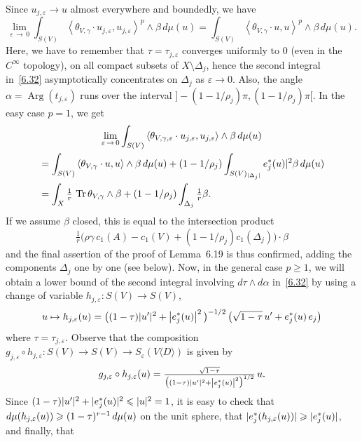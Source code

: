 \documentclass[AHL,Unicode,longabstracts,published]{cedram}
\DeclareMathOperator{\Arg}{Arg}
\DeclareMathOperator{\Tr}{Tr}
\DeclarePairedDelimiter{\abs}{\lvert}{\rvert}
\let\leq\leqslant
\let\geq\geqslant
\begin{document}
Since $u_{j,\varepsilon}\to u$ almost everywhere and boundedly, we have
\[
\lim_{\varepsilon\,\to\,0}
\int_{S(V)}\left\langle\theta_{V,\gamma}\cdot u_{j,\varepsilon},u_{j,\varepsilon}\right\rangle^p
\wedge\beta\,d\mu(u)=
\int_{S(V)}
\left\langle\theta_{V,\gamma}\cdot u,u\right\rangle^p\wedge\beta\,d\mu(u).
\]
Here, we have to remember that $\tau=\tau_{j,\varepsilon}$ converges uniformly to $0$ (even in the $C^\infty$ topology), on all compact subsets of $X\setminus\Delta_j$, hence the second integral in~\eqref{6.32} asymptotically concentrates on $\Delta_j$ as $\varepsilon\to 0$. Also, the angle $\alpha=\Arg(t_{j,\varepsilon})$ runs over the interval $]-(1-1/\rho_j)\pi,(1-1/\rho_j)\pi[$. In the easy case
$p=1$, we get
\begin{multline*}
\lim_{\varepsilon\,\to\,0}
\int_{S(V)}\left\langle\theta_{V,\gamma,\varepsilon}\cdot u_{j,\varepsilon}, u_{j,\varepsilon}\right\rangle\wedge\beta\,d\mu(u)\\
\begin{aligned}
&=\int_{S(V)}\left\langle\theta_{V,\gamma}\cdot u,u\right\rangle\wedge\beta\,d\mu(u) +(1-1/\rho_j)\int_{S(V)_{\abs{\Delta_j}}}e_j^*(u)|^2\beta\,d\mu(u)\\
&=\int_{X}\tfrac{1}{r}\,\Tr\theta_{V,\gamma}\wedge\beta +(1-1/\rho_j)\int_{\Delta_j}\tfrac{1}{ r}\beta.
\end{aligned}
\end{multline*}
If we assume $\beta$ closed, this is equal to the intersection product
\[
\tfrac{1}{ r}\big(\rho\gamma\,c_1(A)-c_1(V)+(1-1/\rho_j) c_1(\Delta_j)\big)\cdot\beta
\]
and the final assertion of the proof of Lemma~6.19 is thus confirmed, adding the components $\Delta_j$ one by one (see below). Now, in the general case $p\geq 1$, we will obtain a lower bound of the second integral involving $d\tau\wedge d\alpha$ in~\eqref{6.32} by using a change of variable $h_{j,\varepsilon}\colon S(V)\to S(V)$,
\[
u\mapsto h_{j,\varepsilon}(u) =
\big((1-\tau)\abs{u'}^2+\left|e_j^*(u)\right|^2\big)^{-1/2}\,
\big(\sqrt{1-\tau}\,u'+e_j^*(u)\,e_j\big)
\]
where $\tau=\tau_{j,\varepsilon}$. Observe that the composition $g_{j,\varepsilon}\circ h_{j,\varepsilon}\colon S(V)\to S(V)\to S_\varepsilon(V\langle D\rangle)$ is given by
\[
g_{j,\varepsilon}\circ h_{j,\varepsilon}(u) =
\tfrac{\sqrt{1-\tau}}{
\big((1-\tau)\abs{u'}^2+\left|e_j^*(u)\right|^2\big)^{1/2}}\,u.
\]
Since $(1-\tau)\abs{u'}^2+\abs{e_j^*(u)}^2\leq\abs{u}^2=1$, it is easy to check that $d\mu(h_{j,\varepsilon}(u))\linebreak\geq(1-\tau)^{r-1}\,d\mu(u)$ on the unit sphere, that $\abs{e_j^*(h_{j,\varepsilon}(u))}\geq \abs{e_j^*(u)}$, and finally, that
\end{document}
